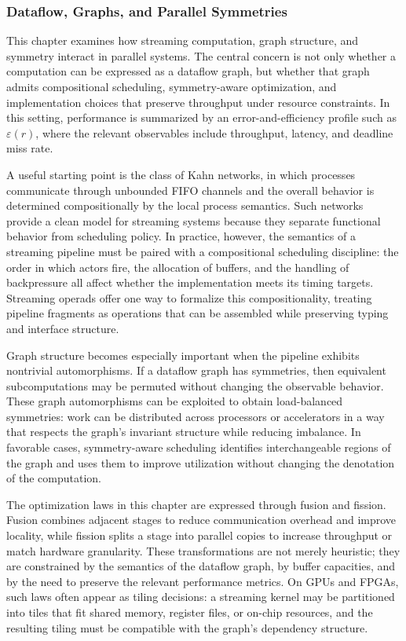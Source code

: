 \documentclass[11pt]{article}
\begin{document}
\subsubsection{Dataflow, Graphs, and Parallel Symmetries}

This chapter examines how streaming computation, graph structure, and symmetry interact in parallel systems. The central concern is not only whether a computation can be expressed as a dataflow graph, but whether that graph admits compositional scheduling, symmetry-aware optimization, and implementation choices that preserve throughput under resource constraints. In this setting, performance is summarized by an error-and-efficiency profile such as \(\varepsilon(r)\), where the relevant observables include throughput, latency, and deadline miss rate.

A useful starting point is the class of Kahn networks, in which processes communicate through unbounded FIFO channels and the overall behavior is determined compositionally by the local process semantics. Such networks provide a clean model for streaming systems because they separate functional behavior from scheduling policy. In practice, however, the semantics of a streaming pipeline must be paired with a compositional scheduling discipline: the order in which actors fire, the allocation of buffers, and the handling of backpressure all affect whether the implementation meets its timing targets. Streaming operads offer one way to formalize this compositionality, treating pipeline fragments as operations that can be assembled while preserving typing and interface structure.

Graph structure becomes especially important when the pipeline exhibits nontrivial automorphisms. If a dataflow graph has symmetries, then equivalent subcomputations may be permuted without changing the observable behavior. These graph automorphisms can be exploited to obtain load-balanced symmetries: work can be distributed across processors or accelerators in a way that respects the graph's invariant structure while reducing imbalance. In favorable cases, symmetry-aware scheduling identifies interchangeable regions of the graph and uses them to improve utilization without changing the denotation of the computation.

The optimization laws in this chapter are expressed through fusion and fission. Fusion combines adjacent stages to reduce communication overhead and improve locality, while fission splits a stage into parallel copies to increase throughput or match hardware granularity. These transformations are not merely heuristic; they are constrained by the semantics of the dataflow graph, by buffer capacities, and by the need to preserve the relevant performance metrics. On GPUs and FPGAs, such laws often appear as tiling decisions: a streaming kernel may be partitioned into tiles that fit shared memory, register files, or on-chip resources, and the resulting tiling must be compatible with the graph's dependency structure.
\end{document}
